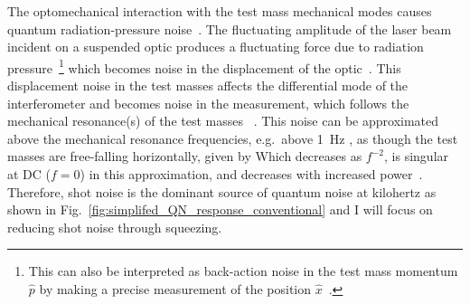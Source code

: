 The optomechanical interaction with the test mass mechanical modes causes quantum radiation-pressure noise~\cite{}.
The fluctuating amplitude of the laser beam incident on a suspended optic produces a fluctuating force due to radiation pressure~\footnote{This can also be interpreted as back-action noise in the test mass momentum $\hat p$ by making a precise measurement of the position $\hat x$~\cite{}. } which becomes noise in the displacement of the optic~\cite{}.  This displacement noise in the test masses affects the differential mode of the interferometer and becomes noise in the measurement, which follows the mechanical resonance(s) of the test masses~\cite{} . 
This noise can be approximated above the mechanical resonance frequencies, e.g.\ above 1~Hz , as though the test masses are free-falling horizontally, given by 
Which decreases as $f^{-2}$, is singular at DC ($f=0$) in this approximation, and decreases with increased power~\cite{}. 
Therefore, shot noise is the dominant source of quantum noise at kilohertz as shown in Fig.~\ref{fig:simplifed_QN_response_conventional} and I will focus on reducing shot noise through squeezing.

